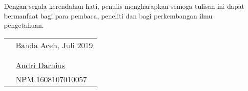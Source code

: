 \newpage
Dengan segala kerendahan hati, penulis mengharapkan semoga tulisan ini
dapat bermanfaat bagi para pembaca, peneliti dan bagi perkembangan ilmu
pengetahuan.

\vspace{0.5cm}


\begin{tabular}{p{7.5cm}l}
	&Banda Aceh, Juli 2019\\
	&\\
	&\\
	&\underline{Andri Darnius}\\
	&NPM.1608107010057
\end{tabular}